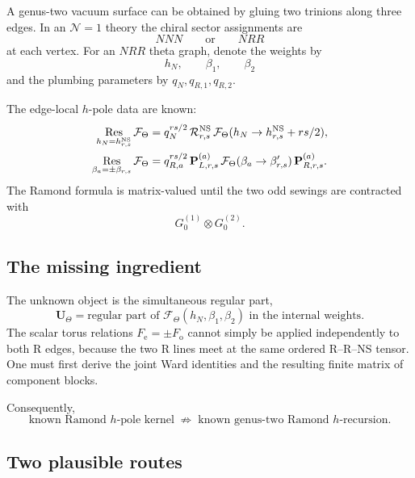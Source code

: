 \documentclass[11pt]{article}
\newcommand{\NS}{\mathrm{NS}}
\newcommand{\F}{\mathcal F}
\newcommand{\Res}{\operatorname*{Res}}
\begin{document}
A genus-two vacuum surface can be obtained by gluing two trinions along
three edges.  In an \(\mathcal N=1\) theory the chiral sector assignments are
\begin{equation}
 NNN
 \qquad\text{or}\qquad
 NRR
\end{equation}
at each vertex.  For an \(NRR\) theta graph, denote the weights by
\begin{equation}
 h_N,\qquad \beta_1,\qquad\beta_2
\end{equation}
and the plumbing parameters by
\(q_N,q_{R,1},q_{R,2}\).

The edge-local \(h\)-pole data are known:
\begin{align}
 \Res_{h_N=h^\NS_{r,s}}\F_\Theta
 &=
 q_N^{rs/2}\,
 \mathcal R^\NS_{r,s}\,
 \F_\Theta(h_N\to h^\NS_{r,s}+rs/2),
 \notag\\
 \Res_{\beta_a=\pm\beta_{r,s}}\F_\Theta
 &=
 q_{R,a}^{rs/2}\,
 \mathbf P^{(a)}_{L,r,s}\,
 \F_\Theta(\beta_a\to\beta'_{r,s})\,
 \mathbf P^{(a)}_{R,r,s}.
 \label{eq:nrr-local-residues}
\end{align}
The Ramond formula is matrix-valued until the two odd sewings are
contracted with
\begin{equation}
 G_0^{(1)}\otimes G_0^{(2)}.
 \label{eq:two-g0}
\end{equation}

\subsection{The missing ingredient}

The unknown object is the simultaneous regular part,
\begin{equation}
 \mathbf U_\Theta
 =
 \text{regular part of }
 \F_\Theta(h_N,\beta_1,\beta_2)
 \text{ in the internal weights}.
 \label{eq:theta-regular-part}
\end{equation}
The scalar torus relations
\(F_{\mathrm e}=\pm F_{\mathrm o}\) cannot simply be applied independently
to both R edges, because the two R lines meet at the same ordered R--R--NS
tensor.  One must first derive the joint Ward identities and the resulting
finite matrix of component blocks.

Consequently,
\begin{equation}
 \boxed{
 \text{known Ramond \(h\)-pole kernel}
 \;\not\Rightarrow\;
 \text{known genus-two Ramond \(h\)-recursion}.}
 \label{eq:not-yet-recursion}
\end{equation}

\subsection{Two plausible routes}
\end{document}
